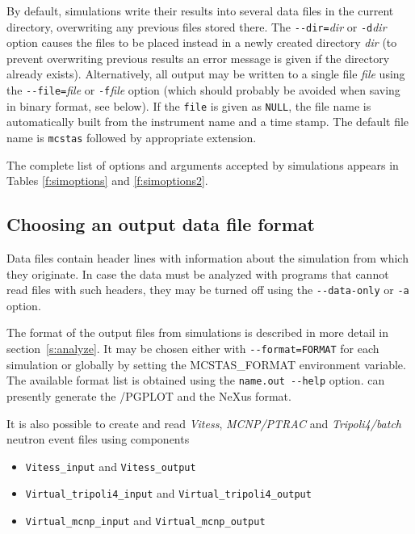 By default, \MCS simulations write their results into several data files in the
current directory, overwriting any previous files stored there. The
\verb+--dir=+\textit{dir} or \verb+-d+\textit{dir} option causes the files to be
placed instead in a newly created directory \textit{dir} (to prevent overwriting
previous results an error message is given if the directory already exists).
Alternatively, all output may be written to a single file \textit{file} using
the \verb+--file=+\textit{file} or \verb+-f+\textit{file} option (which should
probably be avoided when saving in binary format, see below). If the \verb+file+
is given as \verb+NULL+, the file name is automatically built from the
instrument name and a time stamp. The default file name is \verb+mcstas+
followed by appropriate extension.

The complete list of options
and arguments accepted by \MCS simulations appears in
Tables \ref{f:simoptions} and \ref{f:simoptions2}.

\subsection{Choosing an output data file format}

Data files contain header lines with information about the simulation from which
they originate. In case the data must be analyzed with programs that cannot read
files with such headers, they may be turned off using the \verb+--data-only+ or
\verb+-a+ option.  

The format of the output files from \MCS simulations is described in more
detail in section~\ref{s:analyze}. It may be chosen either with
\verb+--format=FORMAT+ for each simulation or globally by setting the
MCSTAS\_FORMAT environment variable. 
The available format list is obtained using the \verb+name.out --help+ option. 
 \MCS can presently generate the \MCS /PGPLOT and the NeXus format. 

It is also possible to create and read \textit{Vitess}, \textit{MCNP/PTRAC} and
\textit{Tripoli4/batch} neutron event files using components
\begin{itemize}
\item \verb+Vitess_input+ and \verb+Vitess_output+
\item \verb+Virtual_tripoli4_input+ and \verb+Virtual_tripoli4_output+
\item \verb+Virtual_mcnp_input+ and \verb+Virtual_mcnp_output+
\end{itemize}  

